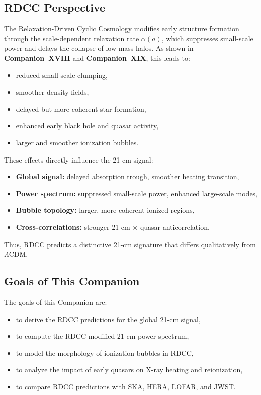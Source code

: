 \documentclass[11pt,a4paper]{article}
\begin{document}
\subsection{RDCC Perspective}

The Relaxation-Driven Cyclic Cosmology modifies early structure formation through the
scale-dependent relaxation rate $\alpha(a)$, which suppresses small-scale power and delays the
collapse of low-mass halos. As shown in \textbf{Companion~XVIII} and \textbf{Companion~XIX},
this leads to:
\begin{itemize}
\item reduced small-scale clumping,
\item smoother density fields,
\item delayed but more coherent star formation,
\item enhanced early black hole and quasar activity,
\item larger and smoother ionization bubbles.
\end{itemize}

These effects directly influence the 21-cm signal:
\begin{itemize}
\item \textbf{Global signal:} delayed absorption trough, smoother heating transition,
\item \textbf{Power spectrum:} suppressed small-scale power, enhanced large-scale modes,
\item \textbf{Bubble topology:} larger, more coherent ionized regions,
\item \textbf{Cross-correlations:} stronger 21-cm $\times$ quasar anticorrelation.
\end{itemize}

Thus, RDCC predicts a distinctive 21-cm signature that differs qualitatively from
$\Lambda$CDM.

\subsection{Goals of This Companion}

The goals of this Companion are:
\begin{itemize}
\item to derive the RDCC predictions for the global 21-cm signal,
\item to compute the RDCC-modified 21-cm power spectrum,
\item to model the morphology of ionization bubbles in RDCC,
\item to analyze the impact of early quasars on X-ray heating and reionization,
\item to compare RDCC predictions with SKA, HERA, LOFAR, and JWST.
\end{itemize}
\end{document}
